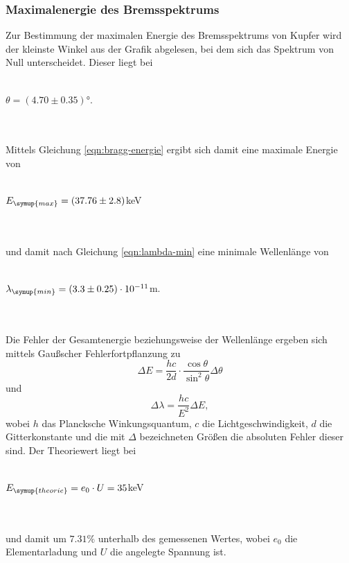     \subsubsection{Maximalenergie des Bremsspektrums}
        Zur Bestimmung der maximalen Energie des Bremsspektrums von Kupfer wird der kleinste Winkel aus der Grafik abgelesen, bei dem sich 
        das Spektrum von Null unterscheidet. Dieser liegt bei 
        \\ \\
        \centerline{$\theta = (4.70  \pm 0.35)° $.}
        \\ \\
        Mittels Gleichung \eqref{eqn:bragg-energie} ergibt sich damit eine maximale Energie von
        \\ \\
        \centerline{$E_{\symup{max}} = (37.76 \pm 2.8)$keV}
        \\ \\ 
        und damit nach Gleichung \eqref{eqn:lambda-min} eine minimale Wellenlänge von
        \\ \\
        \centerline{$\lambda_{\symup{min}} = (3.3 \pm 0.25) \cdot 10^{-11}$m.}
        \\ \\
        Die Fehler der Gesamtenergie beziehungsweise der Wellenlänge ergeben sich mittels Gaußscher Fehlerfortpflanzung zu 
        \begin{equation}
        \label{eqn:fehlerE}
            \Delta E = \frac{h c}{2 d} \cdot \frac{\cos{\theta}}{\sin^2{\theta}} \Delta \theta
        \end{equation}
        und 
        \begin{equation}
        \label{eqn:fehlerL}
            \Delta \lambda = \frac{h c}{E^2} \Delta E,
        \end{equation}
        wobei $h$ das Plancksche Winkungsquantum, $c$ die Lichtgeschwindigkeit, $d$ die Gitterkonstante und die mit $\Delta$ bezeichneten
        Größen die absoluten Fehler dieser sind. 
        Der Theoriewert liegt  bei 
        \\ \\
        \centerline{$E_{\symup{theorie}} = e_0 \cdot U = 35$keV}
        \\ \\
        und damit um $7.31 \%$ unterhalb des gemessenen Wertes, wobei $e_0$ die Elementarladung und $U$ die angelegte Spannung ist.

